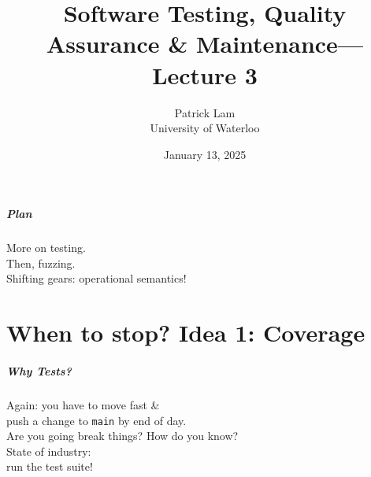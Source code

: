 \documentclass{beamer}
\title{Software Testing, Quality Assurance \& Maintenance---Lecture 3}
\author{Patrick Lam\\University of Waterloo}
\date{January 13, 2025}
\newenvironment{changemargin}[1]{%
  \begin{list}{}{%
    \setlength{\topsep}{0pt}%
    \setlength{\leftmargin}{#1}%
    \setlength{\rightmargin}{1em}
    \setlength{\listparindent}{\parindent}%
    \setlength{\itemindent}{\parindent}%
    \setlength{\parsep}{\parskip}%
  }%
  \item[]}{\end{list}}
\begin{document}
\begin{frame}
  \titlepage
\end{frame}

\begin{frame}
  \frametitle{Plan}

  \begin{changemargin}{2em}

    More on testing.\\[1em]

    Then, fuzzing.\\[2em]

    Shifting gears: operational semantics!
  \end{changemargin}
\end{frame}

\part{When to stop? Idea 1: Coverage}
\begin{frame}
  \partpage
\end{frame}


\begin{frame}
  \frametitle{Why Tests?}
  \begin{center}
    \Large Again: you have to move fast \& \\
    push a change to {\tt main} by end of day.\\[1em]
    Are you going break things? How do you know?\\[2em]
    \Huge \alert{State of industry: \\ run the test suite!}
  \end{center}
\end{frame}

  
\end{document}

